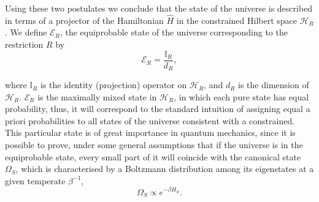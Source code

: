 

\indent Using these two postulates we conclude that the state of the universe is described in terms of a projector of the Hamiltonian $\hat{H}$ in the constrained Hilbert space $\mathcal{H}_R$. We define $\mathcal{E}_{R}$, the equiprobable state of the universe corresponding to the restriction $R$ by
\begin{equation}
\mathcal{E}_R = \frac{\mathbb{I}_{R}}{d_R},
\label{CH1:equiprobable_state}
\end{equation}

where $\mathbb{I}_{R}$ is the identity (projection) operator on $\mathcal{H}_R$, and $d_R$ is the dimension of $\mathcal{H}_R$. $\mathcal{E}_R$ is the maximally mixed state in $\mathcal{H}_R$, in which each pure state has equal probability, thus, it will correspond to the standard intuition of assigning equal a priori probabilities to all states of the universe consistent with a constrained. This particular state is of great importance in quantum mechanics, since it is possible to prove, under some general assumptions that if the universe is in the equiprobable state, every small part of it will coincide with the canonical state  $\Omega_{S}$, which is characterised by a Boltzmann distribution among its eigenstates at a given temperate $\beta^{-1}$, 
\begin{equation}
\Omega_S \propto e^{-\beta H_{S}}.
\label{CH1:Canonical_form}
\end{equation}
